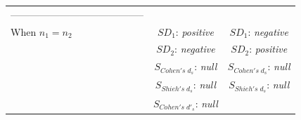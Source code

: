 \documentclass[
  man]{apa6}
\begin{document}
\begin{longtable}[]{@{}lcc@{}}
\begin{minipage}[t]{0.35\columnwidth}
-----------------------------------------\strut
\end{minipage}\tabularnewline
\begin{minipage}[t]{0.27\columnwidth}\raggedright
When \(n_1=n_2\)\strut
\end{minipage} & \begin{minipage}[t]{0.29\columnwidth}\centering
\(SD_1\): \emph{positive}\strut
\end{minipage} & \begin{minipage}[t]{0.35\columnwidth}\centering
\(SD_1\): \emph{negative}\strut
\end{minipage}\tabularnewline
\begin{minipage}[t]{0.27\columnwidth}\raggedright
\strut
\end{minipage} & \begin{minipage}[t]{0.29\columnwidth}\centering
\(SD_2\): \emph{negative}\strut
\end{minipage} & \begin{minipage}[t]{0.35\columnwidth}\centering
\(SD_2\): \emph{positive}\strut
\end{minipage}\tabularnewline
\begin{minipage}[t]{0.27\columnwidth}\raggedright
\strut
\end{minipage} & \begin{minipage}[t]{0.29\columnwidth}\centering
\(S_{Cohen's \; d_s}\): \emph{null}\strut
\end{minipage} & \begin{minipage}[t]{0.35\columnwidth}\centering
\(S_{Cohen's \; d_s}\): \emph{null}\strut
\end{minipage}\tabularnewline
\begin{minipage}[t]{0.27\columnwidth}\raggedright
\strut
\end{minipage} & \begin{minipage}[t]{0.29\columnwidth}\centering
\(S_{Shieh's \; d_s}\): \emph{null}\strut
\end{minipage} & \begin{minipage}[t]{0.35\columnwidth}\centering
\(S_{Shieh's \; d_s}\): \emph{null}\strut
\end{minipage}\tabularnewline
\begin{minipage}[t]{0.27\columnwidth}\raggedright
\strut
\end{minipage} & \begin{minipage}[t]{0.29\columnwidth}\centering
\(S_{Cohen's \; d'_s}\): \emph{null}\strut
\end{minipage} & \begin{minipage}[t]{0.35\columnwidth}\centering

\end{minipage}
\end{longtable}
\end{document}
